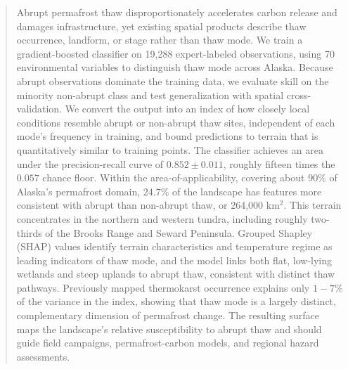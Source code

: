 \documentclass[../main.tex]{subfiles}
\begin{document}
\begin{abstract}

Abrupt permafrost thaw disproportionately accelerates carbon release and damages infrastructure, yet existing spatial products describe thaw occurrence, landform, or stage rather than thaw mode. We train a gradient-boosted classifier on 19,288 expert-labeled observations, using 70 environmental variables to distinguish thaw mode across Alaska. Because abrupt observations dominate the training data, we evaluate skill on the minority non-abrupt class and test generalization with spatial cross-validation. We convert the output into an index of how closely local conditions resemble abrupt or non-abrupt thaw sites, independent of each mode's frequency in training, and bound predictions to terrain that is quantitatively similar to training points. The classifier achieves an area under the precision-recall curve of $0.852\pm 0.011$, roughly fifteen times the $0.057$ chance floor. Within the area-of-applicability, covering about $90\%$ of Alaska's permafrost domain, $24.7\%$ of the landscape has features more consistent with abrupt than non-abrupt thaw, or 264,000 km$^2$. This terrain concentrates in the northern and western tundra, including roughly two-thirds of the Brooks Range and Seward Peninsula. Grouped Shapley (SHAP) values identify terrain characteristics and temperature regime as leading indicators of thaw mode, and the model links both flat, low-lying wetlands and steep uplands to abrupt thaw, consistent with distinct thaw pathways. Previously mapped thermokarst occurrence explains only $1-7\%$ of the variance in the index, showing that thaw mode is a largely distinct, complementary dimension of permafrost change. The resulting surface maps the landscape's relative susceptibility to abrupt thaw and should guide field campaigns, permafrost-carbon models, and regional hazard assessments.


\end{abstract}
\end{document}
